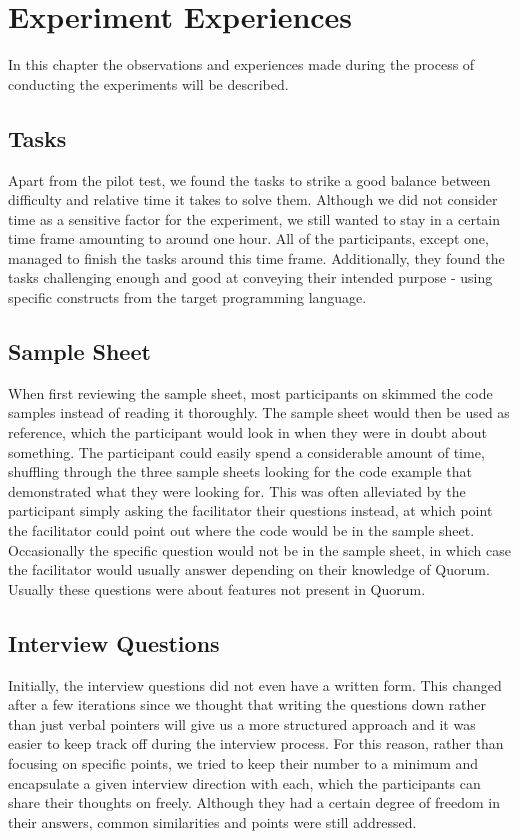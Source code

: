 \chapter{Experiment Experiences}
In this chapter the observations and experiences made during the process of conducting the experiments will be described.

\section{Tasks}
Apart from the pilot test, we found the tasks to strike a good balance between difficulty and relative time it takes to solve them. Although we did not consider time as a sensitive factor for the experiment, we still wanted to stay in a certain time frame amounting to around one hour. All of the participants, except one, managed to finish the tasks around this time frame. Additionally, they found the tasks challenging enough and good at conveying their intended purpose - using specific constructs from the target programming language. 

\section{Sample Sheet}
When first reviewing the sample sheet, most participants on skimmed the code samples instead of reading it thoroughly. The sample sheet would then be used as reference, which the participant would look in when they were in doubt about something. The participant could easily spend a considerable amount of time, shuffling through the three sample sheets looking for the code example that demonstrated what they were looking for. This was often alleviated by the participant simply asking the facilitator their questions instead, at which point the facilitator could point out where the code would be in the sample sheet. Occasionally the specific question would not be in the sample sheet, in which case the facilitator would usually answer depending on their knowledge of Quorum. Usually these questions were about features not present in Quorum.

\section{Interview Questions}
Initially, the interview questions did not even have a written form. This changed after a few iterations since we thought that writing the questions down rather than just verbal pointers will give us a more structured approach and it was easier to keep track off during the interview process. For this reason, rather than focusing on specific points, we tried to keep their number to a minimum and encapsulate a given interview direction with each, which the participants can share their thoughts on freely. Although they had a certain degree of freedom in their answers, common similarities and points were still addressed. 